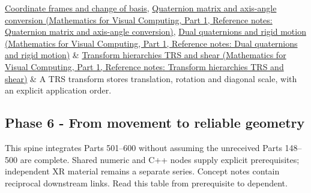 {\begin{longtable}[]
\hyperref[appendix-1bae9457dbc3]{Coordinate frames and change of basis}, \href{../02-Mathematics-for-Visual-Computing-P01/main.pdf\#nameddest=appendix-26d8da71f6c4}{Quaternion matrix and axis-angle conversion (Mathematics for Visual Computing, Part 1, Reference notes: Quaternion matrix and axis-angle conversion)}, \href{../02-Mathematics-for-Visual-Computing-P01/main.pdf\#nameddest=appendix-d1ea57347893}{Dual quaternions and rigid motion (Mathematics for Visual Computing, Part 1, Reference notes: Dual quaternions and rigid motion)} & \href{../02-Mathematics-for-Visual-Computing-P01/main.pdf\#nameddest=appendix-292c061cd47c}{Transform hierarchies TRS and shear (Mathematics for Visual Computing, Part 1, Reference notes: Transform hierarchies TRS and shear)} & A TRS transform stores translation, rotation and diagonal scale, with an explicit application order. \\
\end{longtable}
}

\subsection{Phase 6 - From movement to reliable geometry}\label{appendix-4ad47bdd269a-phase-6---from-movement-to-reliable-geometry}

\hypertarget{appendix-4ad47bdd269a-phase-6---from-movement-to-reliable-geometry}{}

This spine integrates Parts 501--600 without assuming the unreceived Parts 148--500 are complete. Shared numeric and C++ nodes supply explicit prerequisites; independent XR material remains a separate series. Concept notes contain reciprocal downstream links. Read this table from prerequisite to dependent.

